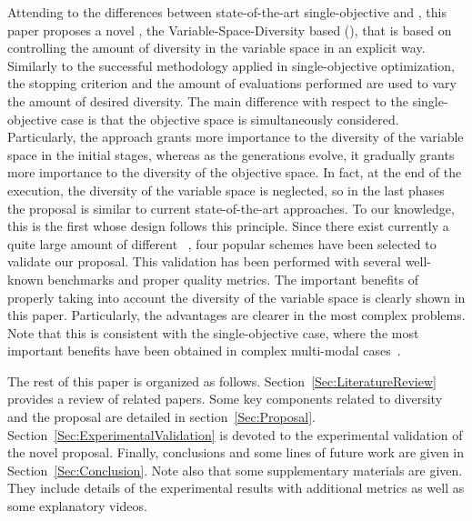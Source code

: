 Attending to the differences between state-of-the-art single-objective \EAS{} and \MOEAS{}, 
this paper proposes a novel \MOEA{}, the Variable-Space-Diversity based \MOEA{} (\VSDMOEA{}), 
that is based on controlling the amount of diversity in the variable space in an explicit way.
%
Similarly to the successful methodology applied in single-objective optimization, the stopping criterion and the 
amount of evaluations performed are used to vary the amount of desired diversity.
%
The main difference with respect to the single-objective case is that the objective space is simultaneously considered.
%
Particularly, the approach grants more importance to the diversity of the variable space in the initial stages, whereas 
as the generations evolve, it gradually grants more importance to the diversity of the objective space.
%
In fact, at the end of the execution, the diversity of the variable space is neglected, so in the last phases the proposal is similar to current state-of-the-art approaches.
%
To our knowledge, this is the first \MOEA{} whose design follows this principle.
%
Since there exist currently a quite large amount of different \MOEAS{}~\cite{Joel:MOEA_APPLICATIONS_BOOK_KCTAN}, 
four popular schemes have been selected to validate our proposal.
%
%
%
%
%
This validation has been performed with several well-known benchmarks and proper quality metrics.
%
The important benefits of properly taking into account the diversity of the variable space is
clearly shown in this paper.
%
Particularly, the advantages are clearer in the most complex problems.
%
Note that this is consistent with the single-objective case, where the most important benefits have been obtained
in complex multi-modal cases~\cite{Segura:17}.

The rest of this paper is organized as follows. 
%
Section~\ref{Sec:LiteratureReview} provides a review of related papers.
%
Some key components related to diversity and the \VSDMOEA{} proposal are detailed in section~\ref{Sec:Proposal}.
%
Section~\ref{Sec:ExperimentalValidation} is devoted to the experimental validation of the novel proposal.
%
Finally, conclusions and some lines of future work are given in Section~\ref{Sec:Conclusion}.
%
Note also that some supplementary materials are given.
%
They include details of the experimental results with additional metrics as well as some
explanatory videos.

